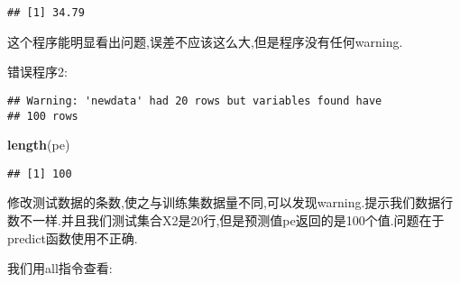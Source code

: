 \documentclass[]{ctexbook}
\newenvironment{Shaded}{\begin{snugshade}}{\end{snugshade}}
\newcommand{\DataTypeTok}[1]{\textcolor[rgb]{0.13,0.29,0.53}{#1}}
\newcommand{\DecValTok}[1]{\textcolor[rgb]{0.00,0.00,0.81}{#1}}
\newcommand{\FloatTok}[1]{\textcolor[rgb]{0.00,0.00,0.81}{#1}}
\newcommand{\KeywordTok}[1]{\textcolor[rgb]{0.13,0.29,0.53}{\textbf{#1}}}
\newcommand{\NormalTok}[1]{#1}
\newcommand{\OperatorTok}[1]{\textcolor[rgb]{0.81,0.36,0.00}{\textbf{#1}}}
\newcommand{\StringTok}[1]{\textcolor[rgb]{0.31,0.60,0.02}{#1}}
\begin{document}
\begin{verbatim}
## [1] 34.79
\end{verbatim}

这个程序能明显看出问题,误差不应该这么大,但是程序没有任何warning.

错误程序2:

\begin{Shaded}
\end{Shaded}

\begin{verbatim}
## Warning: 'newdata' had 20 rows but variables found have
## 100 rows
\end{verbatim}

\begin{Shaded}
\begin{Highlighting}[]
\KeywordTok{length}\NormalTok{(pe)}
\end{Highlighting}
\end{Shaded}

\begin{verbatim}
## [1] 100
\end{verbatim}

修改测试数据的条数,使之与训练集数据量不同,可以发现warning.提示我们数据行数不一样.并且我们测试集合X2是20行,但是预测值pe返回的是100个值.问题在于predict函数使用不正确.

我们用all指令查看:
\end{document}
